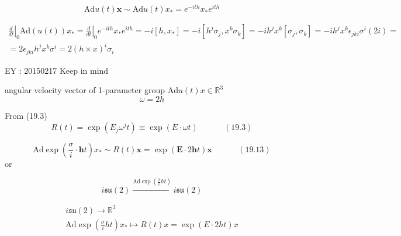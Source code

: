 \[
\text{Ad} u(t) \mathbf{x} \sim \text{Ad}u(t) x_* = e^{-ith} x_* e^{ith}
\]

\[
\begin{gathered}
  \left. \frac{d}{dt} \right|_0 \text{Ad}(u(t)) x_* = \left. \frac{d}{dt} \right|_0 e^{-ith} x_* e^{ith} = -i [h, x_* ] = -i [h^j \sigma_j, x^k\sigma_k] = -ih^jx^k[\sigma_j,\sigma_k] = -ih^jx^k \epsilon_{jki} \sigma^i(2i) =  \\
=  2\epsilon_{jki} h^jx^k\sigma^i   = 2(h\times x)^i\sigma_i
\end{gathered}
\]

EY : 20150217 Keep in mind 


angular velocity vector of 1-parameter group $\text{Ad}u(t) x \in \mathbb{R}^3$ 
\[
\omega = 2h
\]

From (19.3)
\begin{equation}
  R(t) = \exp{ (E_j \omega^j t) } \equiv \exp{ (E\cdot \omega t) } \quad \quad \quad \, (19.3)
\end{equation}

\begin{equation}
\text{Ad}\exp{ \left( \frac{\sigma}{i} \cdot \mathbf{h}t \right)} x_* \sim R(t) \mathbf{x} = \exp{ (\mathbf{E} \cdot 2 \mathbf{h}t ) } \mathbf{x} \quad \quad \quad \, (19.13)
\end{equation}
or

\[
 i\mathfrak{su}(2) \xrightarrow{ \text{Ad}\exp{ \left( \frac{\sigma}{i} ht \right)} } i \mathfrak{su}(2)
\]

\[
\begin{gathered}
  i\mathfrak{su}(2) \to \mathbb{R}^3 \\ 
\boxed{   \text{Ad}\exp{\left( \frac{\sigma}{i} ht \right)}x_* \mapsto R(t) x = \exp{ (E\cdot 2ht) }x   }
\end{gathered}
\]

